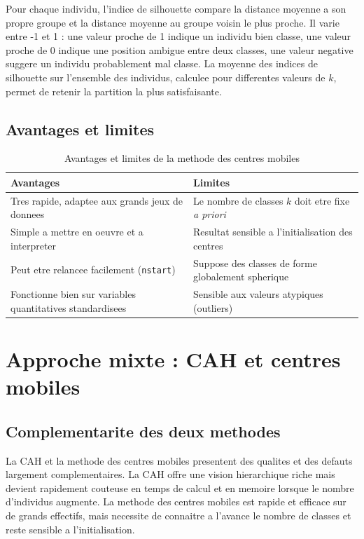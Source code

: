 \documentclass[12pt,a4paper]{book}
\begin{document}
	Pour chaque individu, l'indice de silhouette compare la distance moyenne a son propre groupe et la distance moyenne au groupe voisin le plus proche. Il varie entre -1 et 1 : une valeur proche de 1 indique un individu bien classe, une valeur proche de 0 indique une position ambigue entre deux classes, une valeur negative suggere un individu probablement mal classe. La moyenne des indices de silhouette sur l'ensemble des individus, calculee pour differentes valeurs de $k$, permet de retenir la partition la plus satisfaisante.
	
	\section{Avantages et limites}
	
	\begin{table}[h]
		\centering
		\caption{Avantages et limites de la methode des centres mobiles}
		\label{tab:kmeans_avantages}
		\begin{tabular}{p{6cm}p{6cm}}
			\toprule
			\textbf{Avantages} & \textbf{Limites} \\
			\midrule
			Tres rapide, adaptee aux grands jeux de donnees & Le nombre de classes $k$ doit etre fixe \textit{a priori} \\
			Simple a mettre en oeuvre et a interpreter & Resultat sensible a l'initialisation des centres \\
			Peut etre relancee facilement (\texttt{nstart}) & Suppose des classes de forme globalement spherique \\
			Fonctionne bien sur variables quantitatives standardisees & Sensible aux valeurs atypiques (outliers) \\
			\bottomrule
		\end{tabular}
	\end{table}
	
	\chapter{Approche mixte : CAH et centres mobiles}
	
	\section{Complementarite des deux methodes}
	
	La CAH et la methode des centres mobiles presentent des qualites et des defauts largement complementaires. La CAH offre une vision hierarchique riche mais devient rapidement couteuse en temps de calcul et en memoire lorsque le nombre d'individus augmente. La methode des centres mobiles est rapide et efficace sur de grands effectifs, mais necessite de connaitre a l'avance le nombre de classes et reste sensible a l'initialisation.
	
\end{document}
